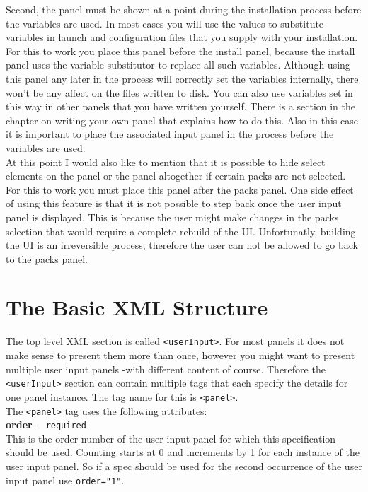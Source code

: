 Second, the panel must be shown at a point during the installation
process before the variables are used. In most cases you will use the
values to substitute variables in launch and configuration files that
you supply with your installation. For this to work you place this panel
before the install panel, because the install panel uses the variable
substitutor to replace all such variables. Although using this panel any
later in the process will correctly set the variables internally, there
won't be any affect on the files written to disk. You can also use
variables set in this way in other panels that you have written
yourself. There is a section in the  chapter on writing your own panel
that explains how to do this. Also in this case it is important to place
the associated input panel in the process before the variables are
used.\\

At this point I would also like to mention that it is possible to hide
select elements on the panel or the panel altogether if certain packs
are not selected. For this to work you must place this panel after the
packs panel. One side effect of using this feature is that it is not
possible to step back once the user input panel is displayed. This is
because the user might make changes in the packs selection that would
require a complete rebuild of the UI. Unfortunatly, building the UI is
an irreversible process, therefore the user can not be allowed to go
back to the packs panel.\\


\section{The Basic XML Structure}

The top level XML section is called \texttt{<userInput>}. For most
panels it does not make sense to present them more than once, however
you might want to present multiple user input panels -with different
content of course. Therefore the \texttt{<userInput>} section can
contain multiple tags that each specify the details for one panel
instance. The tag name for this is \texttt{<panel>}.\\

The \texttt{<panel>} tag uses the following attributes:\\

\textbf{order} \texttt{- required}\\

This is the order number of the user input panel for which this
specification should be used. Counting starts at 0 and increments by 1
for each instance of the user input panel. So if a spec should be used
for the second occurrence of the user input panel use
\texttt{order="1"}.\\

